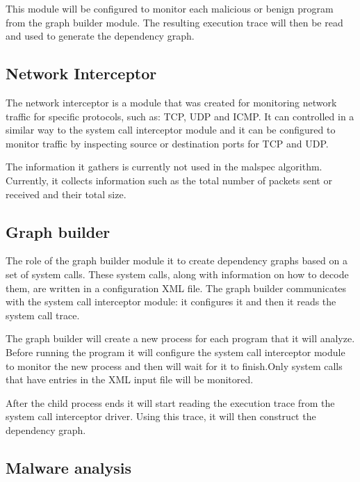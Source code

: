 This module will be configured to monitor each malicious or benign program from the graph builder module. The resulting execution trace will then be read and used to generate the dependency graph.

\subsection{Network Interceptor}

The network interceptor is a module that was created for monitoring network traffic for specific protocols, such as: TCP, UDP and ICMP. It can controlled in a similar way to the system call interceptor module and it can be configured to monitor traffic by inspecting source or destination ports for TCP and UDP.

The information it gathers is currently not used in the malspec algorithm. Currently, it collects information such as the total number of packets sent or received and their total size.

  

\subsection{Graph builder}

The role of the graph builder module it to create dependency graphs based on a set of system calls. These system calls, along with information on how to decode them, are written in a configuration XML file. The graph builder communicates with the system call interceptor module: it configures it and then it reads the system call trace.

The graph builder will create a new process for each program that it will analyze. Before running the program it will configure the system call interceptor module to monitor the new process and then will wait for it to finish.Only system calls that have entries in the XML input file will be monitored.

After the child process ends it will start reading the execution trace from the system call interceptor driver. Using this trace, it will then construct the dependency graph.

\subsection{Malware analysis}
 
